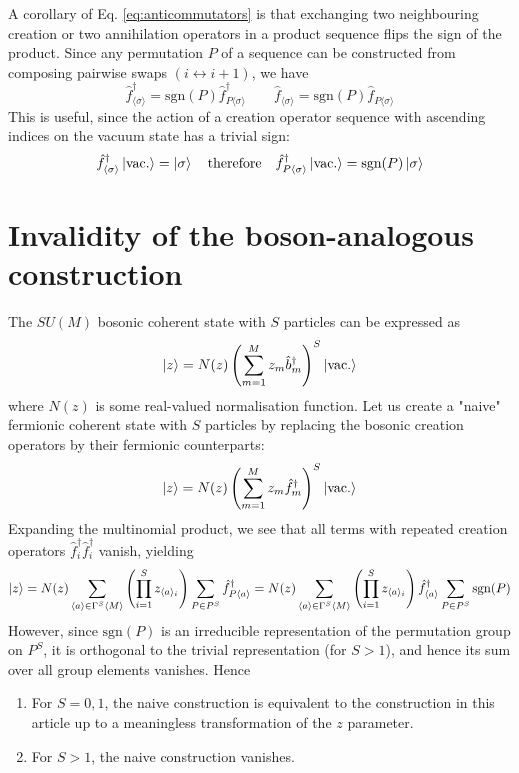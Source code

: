 \documentclass[12pt]{article}
\newcommand{\sgn}{\text{sgn}}
\newcommand{\seq}[1]{\langle #1\rangle}
\newcommand{\hc}{^\dagger}
\begin{document}
	A corollary of Eq. \ref{eq:anticommutators} is that exchanging two neighbouring creation or two annihilation operators in a product sequence flips the sign of the product. Since any permutation $P$ of a sequence can be constructed from composing pairwise swaps $(i\leftrightarrow i+1)$, we have
	\begin{equation}\label{eq:permutation of sequence}
	\hat{f}\hc_{\seq{\sigma}}=\sgn(P)\hat{f}\hc_{P\seq{\sigma}}\qquad\hat{f}_{\seq{\sigma}}=\sgn(P)\hat{f}_{P\seq{\sigma}}
	\end{equation}
	This is useful, since the action of a creation operator sequence with ascending indices on the vacuum state has a trivial sign:
	\begin{equation}\label{eq:ascending creation on vacuum}
	\hat{f}\hc_{\seq{\sigma}}\ket{\rm vac.}=\ket{\sigma}\qq{therefore}\hat{f}\hc_{P\seq{\sigma}}\ket{\rm vac.}=\sgn(P)\ket{\sigma}
	\end{equation}
	
	\section{Invalidity of the boson-analogous construction}
	
	The $SU(M)$ bosonic coherent state with $S$ particles can be expressed as
	\begin{equation}
	\ket{z}=N(z)\left(\sum_{m=1}^Mz_m\hat{b}\hc_m\right)^S\ket{\text{vac.}}
	\end{equation}
	where $N(z)$ is some real-valued normalisation function. Let us create a "naive" fermionic coherent state with $S$ particles by replacing the bosonic creation operators by their fermionic counterparts:
	\begin{equation}
	\ket{z}=N(z)\left(\sum_{m=1}^Mz_m\hat{f}\hc_m\right)^S\ket{\text{vac.}}
	\end{equation}
	Expanding the multinomial product, we see that all terms with repeated creation operators $\hat{f}\hc_i\hat{f}\hc_i$ vanish, yielding
	\begin{equation*}
	\ket{z}=N(z)\sum_{\seq{a}\in\Gamma^S\seq{M}} \left(\prod_{i=1}^S z_{\seq{a}_i}\right) \sum_{P\in P^S} \hat{f}\hc_{P\seq{a}}=N(z)\sum_{\seq{a}\in\Gamma^S\seq{M}} \left(\prod_{i=1}^S z_{\seq{a}_i}\right) \hat{f}\hc_{\seq{a}}\sum_{P\in P^S}\sgn(P)
	\end{equation*}
	However, since $\sgn(P)$ is an irreducible representation of the permutation group on $P^S$, it is orthogonal to the trivial representation (for $S>1$), and hence its sum over all group elements vanishes. Hence
	\begin{enumerate}
		\item For $S=0,1$, the naive construction is equivalent to the construction in this article up to a meaningless transformation of the $z$ parameter.
		\item For $S>1$, the naive construction vanishes.
	\end{enumerate}
	
\end{document}

